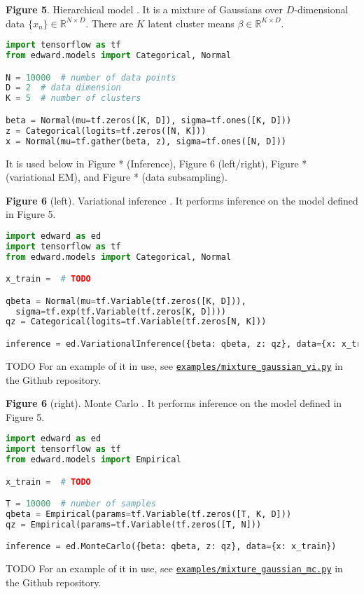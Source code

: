 \textbf{Figure 5}. Hierarchical model \citep{gelman2006data}.
  It is a mixture of Gaussians over
  $D$-dimensional data $\{x_n\}\in\mathbb{R}^{N\times D}$. There are
  $K$ latent cluster means $\beta\in\mathbb{R}^{K\times D}$.
\begin{lstlisting}[language=python]
import tensorflow as tf
from edward.models import Categorical, Normal

N = 10000  # number of data points
D = 2  # data dimension
K = 5  # number of clusters

beta = Normal(mu=tf.zeros([K, D]), sigma=tf.ones([K, D]))
z = Categorical(logits=tf.zeros([N, K]))
x = Normal(mu=tf.gather(beta, z), sigma=tf.ones([N, D]))
\end{lstlisting}
It is used below in Figure * (Inference), Figure 6 (left/right),
Figure * (variational EM), and Figure * (data subsampling).

\textbf{Figure 6} (left). Variational inference
\citep{jordan1999introduction}.
It performs inference on the model defined in Figure 5.
\begin{lstlisting}[language=python]
import edward as ed
import tensorflow as tf
from edward.models import Categorical, Normal

x_train =  # TODO

qbeta = Normal(mu=tf.Variable(tf.zeros([K, D])),
  sigma=tf.exp(tf.Variable(tf.zeros[K, D])))
qz = Categorical(logits=tf.Variable(tf.zeros[N, K]))

inference = ed.VariationalInference({beta: qbeta, z: qz}, data={x: x_train})
\end{lstlisting}
TODO
For an example of it in use, see
\href{https://github.com/blei-lab/edward/blob/master/examples/mixture_gaussian_vi.py}{\texttt{examples/mixture_gaussian_vi.py}}
in the Github repository.

\textbf{Figure 6} (right). Monte Carlo \citep{robert1999monte}.
It performs inference on the model defined in Figure 5.
\begin{lstlisting}[language=python]
import edward as ed
import tensorflow as tf
from edward.models import Empirical

x_train =  # TODO

T = 10000  # number of samples
qbeta = Empirical(params=tf.Variable(tf.zeros([T, K, D]))
qz = Empirical(params=tf.Variable(tf.zeros([T, N]))

inference = ed.MonteCarlo({beta: qbeta, z: qz}, data={x: x_train})
\end{lstlisting}
TODO
For an example of it in use, see
\href{https://github.com/blei-lab/edward/blob/master/examples/mixture_gaussian_mc.py}{\texttt{examples/mixture_gaussian_mc.py}}
in the Github repository.

